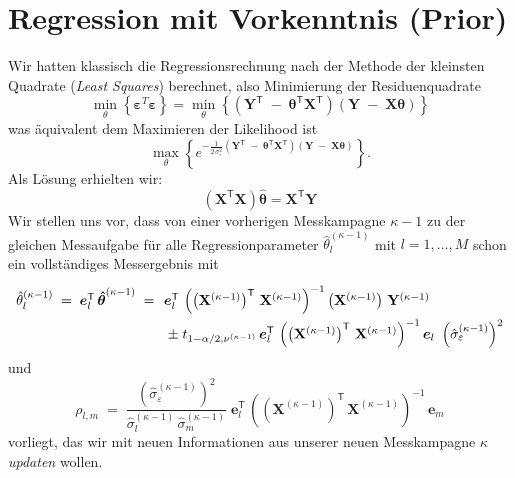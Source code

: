 \section{Regression mit Vorkenntnis (Prior)}
Wir hatten klassisch die Regressionsrechnung nach der Methode der kleinsten Quadrate
(\textsl{Least Squares}) berechnet, also Minimierung der Residuenquadrate
$$
\min\limits_{\theta} \left\{ \boldsymbol{\varepsilon}^T \boldsymbol{\varepsilon} \right\} = \min\limits_{\theta} \left\{ \left(
\mathbf{Y}^\mathsf{T}
\; - \;
\boldsymbol{\theta}^\mathsf{T} \mathbf{X}^\mathsf{T} \right)
\left( \mathbf{Y} \; - \;  \mathbf{X} \boldsymbol{\theta} \right)\right\}
$$
was äquivalent dem Maximieren der Likelihood ist
\begin{equation}
\max\limits_{\theta} \left\{ e^{-\frac{1}{2 \, \sigma_{\varepsilon}^2} \left(
	\mathbf{Y}^\mathsf{T}
	\; - \;
	\boldsymbol{\theta}^\mathsf{T} \mathbf{X}^\mathsf{T} \right)
	\left(\mathbf{Y} \; - \;  \mathbf{X} \boldsymbol{\theta} \right)} \right\} .
\end{equation}
Als Lösung erhielten wir:
$$
\left( \mathbf{X}^\mathsf{T} \mathbf{X} \right) \hat{\boldsymbol{\theta}} =
\mathbf{X}^\mathsf{T} \mathbf{Y}
$$
Wir stellen uns vor, dass von einer vorherigen Messkampagne $\kappa-1$ zu der gleichen Messaufgabe
für alle Regressionparameter $\hat \theta_l^{(\kappa-1)}$ mit $l = 1,\dots,M$ schon ein vollständiges Messergebnis mit
\begin{equation}
\arraycolsep=2.0pt\def\arraystretch{2.0}
\begin{array}{ll}
\hat \theta_l^{(\kappa-1)} \; = \; \boldsymbol{e}_l^\mathsf{T} \, \boldsymbol{\hat \theta}^{(\kappa-1)} \; = \; &
\boldsymbol{e}_l^\mathsf{T} \, \left( \left(\mathbf{X}^{(\kappa-1)}\right)^\mathsf{T}  \, \mathbf{X}^{(\kappa-1)} \right)^{-1} \left(\mathbf{X}^{(\kappa-1)}\right) \, \mathbf{Y}^{(\kappa-1)} \\
& \; \pm \; t_{1-\alpha/2, \nu^{(\kappa-1)}} \,
\boldsymbol{e}_l^\mathsf{T} \,  \left( \left(\mathbf{X}^{(\kappa-1)}\right)^\mathsf{T} \, \mathbf{X}^{(\kappa-1)} \right)^{-1}  \boldsymbol{e}_l \,
\, \left(\hat \sigma_{\varepsilon}^{(\kappa-1)}\right)^2
\end{array}
\end{equation}
und
\begin{equation}
\rho_{l,m} \; = \;
\frac{\left(\hat \sigma_{\varepsilon}^{(\kappa-1)}\right)^2}{\hat \sigma_l^{(\kappa-1)} \,
	\hat \sigma_m^{(\kappa-1)}} \; \boldsymbol{e}_l^\mathsf{T} \,
\left( \left(\mathbf{X}^{(\kappa-1)}\right)^\mathsf{T} \, \mathbf{X}^{(\kappa-1)} \right)^{-1} \, \boldsymbol{e}_m
\end{equation}
vorliegt, das wir mit neuen Informationen aus
unserer neuen Messkampagne $\kappa$ \textsl{updaten} wollen.

